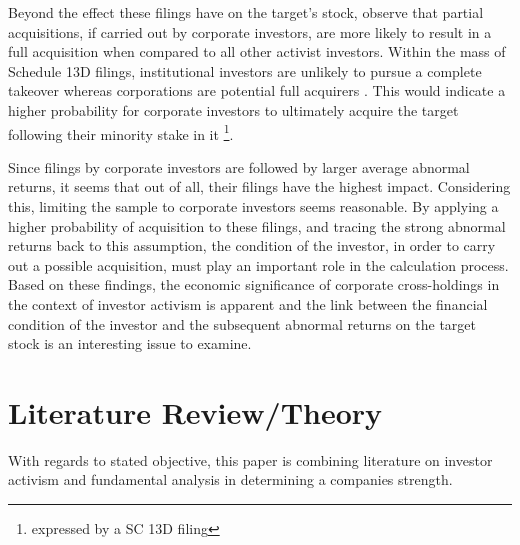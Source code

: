 \documentclass[12pt]{article}
\begin{document}
Beyond the effect these filings have on the target's stock, \citet{Akhigbe2007} observe that partial acquisitions, if carried out by corporate investors, are more likely to result in a full acquisition when compared to all other activist investors. Within the mass of Schedule 13D filings, institutional investors are unlikely to pursue a complete takeover whereas corporations are potential full acquirers \citep{Brigida2012}. This would indicate a higher probability for corporate investors to ultimately acquire the target following their minority stake in it \citep{Greenwood2009} \footnote{expressed by a SC 13D filing}. 

Since filings by corporate investors are followed by larger average abnormal returns, it seems that out of all, their filings have the highest impact. Considering this, limiting the sample to corporate investors seems reasonable. By applying a higher probability of acquisition to these filings, and tracing the strong abnormal returns back to this assumption, the condition of the investor, in order to carry out a possible acquisition, must play an important role in the calculation process. 
Based on these findings, the economic significance of corporate cross-holdings in the context of investor activism is apparent and the link between the financial condition of the investor and the subsequent abnormal returns on the target stock is an interesting issue to examine. 

\section{Literature Review/Theory}

With regards to stated objective, this paper is combining literature on investor activism and fundamental analysis in determining a companies strength.
\end{document}
